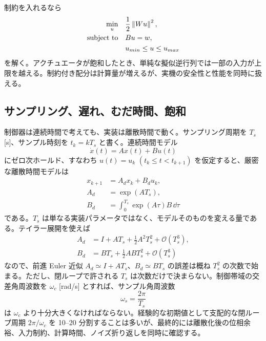 制約を入れるなら
\begin{align}
  \min_u\quad &\frac{1}{2}\left\|Wu\right\|^2,\\
  \text{subject to}\quad &Bu=w,\\
  &u_{min}\le u\le u_{max}
\end{align}
を解く。アクチュエータが飽和したとき、単純な擬似逆行列では一部の入力が上限を越える。制約付き配分は計算量が増えるが、実機の安全性と性能を同時に扱える。

\subsection{サンプリング、遅れ、むだ時間、飽和}

制御器は連続時間で考えても、実装は離散時間で動く。サンプリング周期を $T_s$ [s]、サンプル時刻を $t_k=kT_s$ と書く。連続時間モデル
\begin{equation}
  \dot{x}(t)=Ax(t)+Bu(t)
\end{equation}
にゼロ次ホールド、すなわち $u(t)=u_k$ $(t_k\le t<t_{k+1})$ を仮定すると、厳密な離散時間モデルは
\begin{align}
  x_{k+1}&=A_dx_k+B_du_k,\\
  A_d&=\exp(AT_s),\\
  B_d&=\int_0^{T_s}\exp(A\tau)B\,\dd\tau
\end{align}
である。$T_s$ は単なる実装パラメータではなく、モデルそのものを変える量である。テイラー展開を使えば
\begin{align}
  A_d&=I+AT_s+\frac{1}{2}A^2T_s^2+\mathcal{O}(T_s^3),\\
  B_d&=BT_s+\frac{1}{2}ABT_s^2+\mathcal{O}(T_s^3)
\end{align}
なので、前進 Euler 近似 $A_d\simeq I+AT_s$、$B_d\simeq BT_s$ の誤差は概ね $T_s^2$ の次数で始まる。ただし、閉ループで許される $T_s$ は次数だけで決まらない。制御帯域の交差角周波数を $\omega_c$ [rad/s] とすれば、サンプル角周波数
\begin{equation}
  \omega_s=\frac{2\pi}{T_s}
\end{equation}
は $\omega_c$ より十分大きくなければならない。経験的な初期値として支配的な閉ループ周期 $2\pi/\omega_c$ を 10--20 分割することは多いが、最終的には離散化後の位相余裕、入力制約、計算時間、ノイズ折り返しを同時に確認する。

